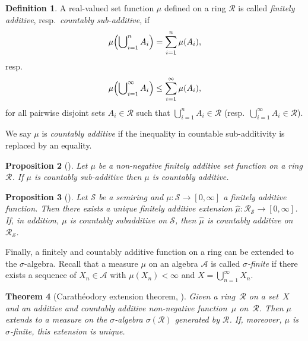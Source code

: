 \documentclass[11pt]{amsart}
\numberwithin{equation}{section}
\numberwithin{figure}{section}
\newtheorem{theorem}{Theorem}[section]
\newtheorem{proposition}[theorem]{Proposition}
\theoremstyle{definition}
\newtheorem{definition}[theorem]{Definition}
\theoremstyle{plain}
\newcommand\cA{\ensuremath{\mathcal{A}}}
\newcommand\cR{\ensuremath{\mathcal{R}}}
\begin{document}
\begin{definition}
A real-valued set function $\mu$ defined on a ring $\mathcal{R}$ is called \emph{finitely additive}, resp.\ \emph{countably sub-additive}, if 
\[
\mu\Bigl(\bigcup\nolimits_{i=1}^n A_i \Bigr) = \sum_{i=1}^n \mu(A_i),
\]
resp.\
\[
\mu\Bigl(\bigcup\nolimits_{i=1}^{\infty} A_i \Bigr) \leq \sum_{i=1}^{\infty} \mu(A_i),
\]
 for all pairwise
disjoint sets $A_i \in \mathcal{R}$
such that $\bigcup_{i=1}^{n}
A_i \in \mathcal{R}$ (resp.\ $\bigcup_{i=1}^{\infty}
A_i \in \mathcal{R}$).


We say $\mu$ is \emph{countably additive} if the inequality in countable sub-additivity is
replaced by an equality. 
\end{definition}

\begin{proposition}[{\cite[1.3.9~Proposition]{Bo07:MeasureTheory}}]
Let $\mu$ be a non-negative finitely additive set function on a ring $\cR$.
If $\mu$ is countably sub-additive then $\mu$ is countably additive.
\label{prop:subadd_to_add}
\end{proposition}

\begin{proposition}[{\cite[1.3.10~Proposition]{Bo07:MeasureTheory}}]
Let $\mathcal S$ be a semiring and $\mu:\mathcal S\to [0,\infty]$ a finitely additive function. Then there exists a unique finitely additive extension
 $\hat\mu:\mathcal R_{\mathcal S} \to [0,\infty]$. If, in addition, $\mu$ is countably subadditive on $\mathcal S$, then $\hat\mu$ is countably additive on $\mathcal R_{\mathcal S}$.
\label{prop:addsemitoring}
\end{proposition}

Finally, a finitely and countably additive function on a ring can be extended to the $\sigma$-algebra.
Recall that a measure $\mu$ on an algebra $\cA$ is called \emph{$\sigma$-finite} if there exists a sequence of $X_n \in \cA$ with $\mu(X_n)<\infty$ and $X=\bigcup_{n=1}^{\infty} X_n$.

\begin{theorem}[Carathéodory extension theorem, {\cite[1.11.8~Theorem]{Bo07:MeasureTheory}}]
Given a ring~$\mathcal{R}$ on a set~$X$ and an additive and countably additive non-negative function~$\mu$ on~$\mathcal{R}$.
Then $\mu$ extends to a measure on the $\sigma$-algebra
$\sigma(\mathcal{R})$ generated by $\mathcal{R}$. If, moreover, $\mu$
is $\sigma$-finite, this extension is unique.
\label{thm:caratheodory}
\end{theorem}
\end{document}
